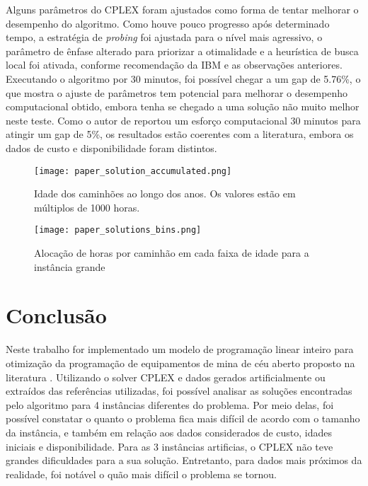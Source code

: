 \documentclass[conference]{IEEEtran}
\begin{document}
Alguns parâmetros do CPLEX foram ajustados como forma de tentar melhorar o desempenho do algoritmo. Como houve pouco progresso após determinado tempo, a estratégia de \textit{probing} foi ajustada para o nível mais agressivo, o parâmetro de ênfase alterado para priorizar a otimalidade e a heurística de busca local foi ativada, conforme recomendação da IBM e as observações anteriores. Executando o algoritmo por 30 minutos, foi possível chegar a um gap de 5.76\%, o que mostra o ajuste de parâmetros tem potencial para melhorar o desempenho computacional obtido, embora tenha se chegado a uma solução não muito melhor neste teste. Como o autor de \cite{topal2010a} reportou um esforço computacional 30 minutos para atingir um gap de 5\%, os resultados estão coerentes com a literatura, embora os dados de custo e disponibilidade foram distintos.

\begin{figure}[h!]
	\centering
	\texttt{[image: paper\_solution\_accumulated.png]}
	\caption{Idade dos caminhões ao longo dos anos. Os valores estão em múltiplos de 1000 horas.}
	\label{fig:paper_solution_accumulated}
\end{figure}




\begin{figure}[h!]
	\centering
	\texttt{[image: paper\_solutions\_bins.png]}
	\caption{Alocação de horas por caminhão em cada faixa de idade para a instância grande}
	\label{fig:paper_solutions_bins}
\end{figure}


\section{Conclusão}

Neste trabalho for implementado um modelo de programação linear inteiro para otimização da programação de equipamentos de mina de céu aberto proposto na literatura \cite{topal2010a}. Utilizando o solver CPLEX e dados gerados artificialmente ou extraídos das referências utilizadas, foi possível analisar as soluções encontradas pelo algoritmo para 4 instâncias diferentes do problema. Por meio delas, foi possível constatar o quanto o problema fica mais difícil de acordo com o tamanho da instância, e também em relação aos dados considerados de custo, idades iniciais e disponibilidade. Para as 3 instâncias artificias, o CPLEX não teve grandes dificuldades para a sua solução. Entretanto, para dados mais próximos da realidade, foi notável o quão mais difícil o problema se tornou.
 
\end{document}
